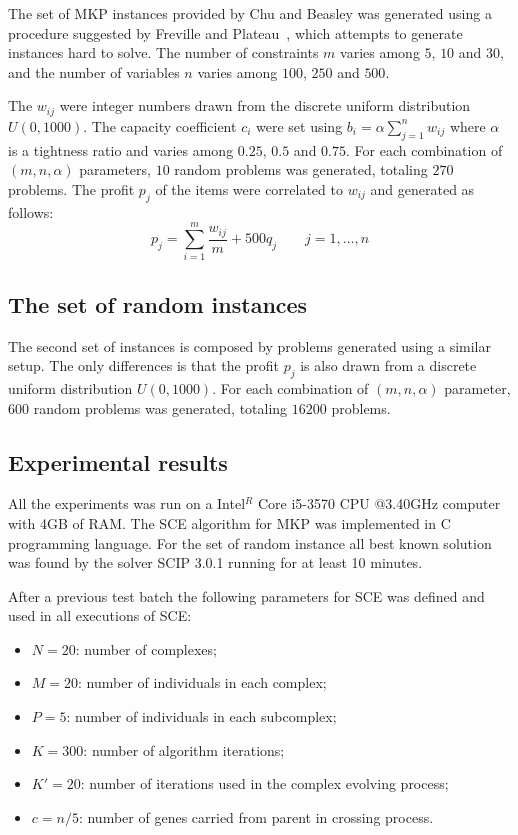 \documentclass[10pt,conference, compsocconf]{IEEEtran}
\begin{document}
The set of MKP instances provided by Chu and Beasley was generated using a
procedure suggested by Freville and Plateau~\cite{freville1994efficient}, which
attempts to generate instances hard to solve.
The number of constraints $m$ varies among $5$, $10$ and $30$, and the number
of variables $n$ varies among $100$, $250$ and $500$.

The $w_{ij}$ were integer numbers drawn from the discrete uniform distribution
$U(0, 1000)$.
The capacity coefficient $c_i$ were set using
$b_i = \alpha\sum_{j=1}^{n} w_{ij}$ where $\alpha$ is a tightness ratio and
varies among $0.25$, $0.5$ and $0.75$.
For each combination of $(m,n,\alpha)$ parameters, $10$ random problems was generated,
totaling $270$ problems.
The profit $p_j$ of the items were correlated to $w_{ij}$ and generated as follows:
\begin{displaymath}
  p_j = \sum_{i=1}^m \frac{w_{ij}}{m} + 500q_j \qquad j = 1, \ldots, n
\end{displaymath}

\subsection{The set of random instances}

The second set of instances is composed by problems generated using a similar
setup.
The only differences is that the profit $p_j$ is also drawn from a discrete uniform
distribution $U(0, 1000)$.
For each combination of $(m, n, \alpha)$ parameter, $600$ random problems was
generated, totaling $16200$ problems.

\subsection{Experimental results}

All the experiments was run on a Intel$^R$ Core i5-3570 CPU @3.40GHz computer
with 4GB of RAM.
The SCE algorithm for MKP was implemented in C programming language.
For the set of random instance all best known solution was found by the solver
SCIP 3.0.1 running for at least 10 minutes.

After a previous test batch the following parameters for SCE was defined and used
in all executions of SCE:
\begin{itemize}
  \item $N = 20$: number of complexes;
  \item $M = 20$: number of individuals in each complex;
  \item $P = 5$: number of individuals in each subcomplex;
  \item $K = 300$: number of algorithm iterations;
  \item $K' = 20$: number of iterations used in the complex evolving process;
  \item $c = n/5$: number of genes carried from parent in crossing process.
\end{itemize}
\end{document}
